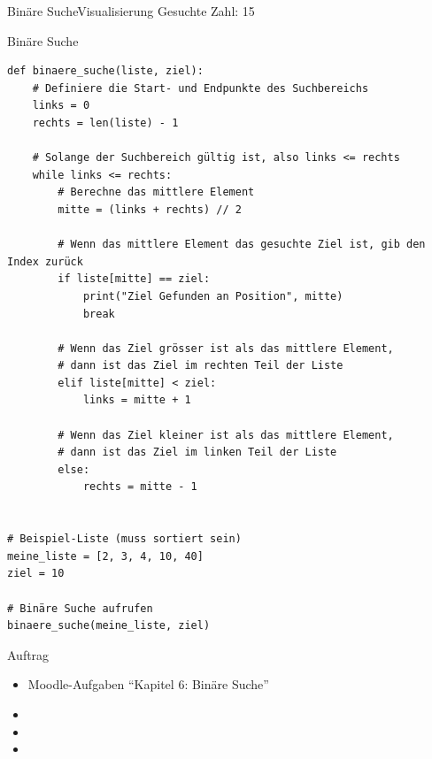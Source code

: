 \begin{frame}[fragile]{Binäre Suche}{Visualisierung}
	Gesuchte Zahl: 15
	\only<1>{
		\begin{figure}[H]
			
			\caption*{Schritt 1}
		\end{figure}
	}


\end{frame}
\begin{frame}[fragile]{Binäre Suche}
	\begin{lstlisting}[basicstyle=\tiny\ttfamily]
def binaere_suche(liste, ziel):
    # Definiere die Start- und Endpunkte des Suchbereichs
    links = 0
    rechts = len(liste) - 1

    # Solange der Suchbereich gültig ist, also links <= rechts
    while links <= rechts:
        # Berechne das mittlere Element
        mitte = (links + rechts) // 2

        # Wenn das mittlere Element das gesuchte Ziel ist, gib den Index zurück
        if liste[mitte] == ziel:
            print("Ziel Gefunden an Position", mitte)
            break

        # Wenn das Ziel grösser ist als das mittlere Element,
        # dann ist das Ziel im rechten Teil der Liste
        elif liste[mitte] < ziel:
            links = mitte + 1

        # Wenn das Ziel kleiner ist als das mittlere Element,
        # dann ist das Ziel im linken Teil der Liste
        else:
            rechts = mitte - 1


# Beispiel-Liste (muss sortiert sein)
meine_liste = [2, 3, 4, 10, 40]
ziel = 10

# Binäre Suche aufrufen
binaere_suche(meine_liste, ziel)
	\end{lstlisting}
\end{frame}

\begin{frame}[fragile]{Auftrag}
	\begin{itemize}
		\item Moodle-Aufgaben \enquote{Kapitel 6: Binäre Suche}
		\item {}
		\item {}
		\item {}
	\end{itemize}
\end{frame}